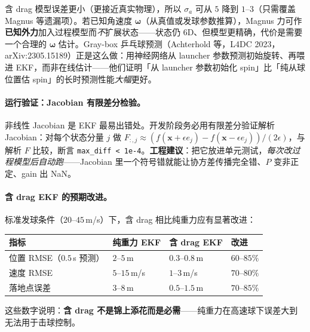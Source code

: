 含 drag 模型误差更小（更接近真实物理），所以 $\sigma_a$ 可从 $5$ 降到 $1$--$3$（只需覆盖 Magnus 等遗漏项）。若已知角速度 $\boldsymbol\omega$（从真值或发球参数推算），Magnus 力可作\textbf{已知外力}加入过程模型而\emph{不}扩展状态——状态仍 6D、但模型更精确，代价是需要一个合理的 $\boldsymbol\omega$ 估计。Gray-box 乒乓球预测（Achterhold 等，L4DC 2023，arXiv:2305.15189）正是这么做：用神经网络从 launcher 参数预测初始旋转、再喂进 EKF，而非在线估计——他们证明「从 launcher 参数初始化 spin」比「纯从球位置估 spin」的长时预测性能\emph{大幅}更好\cite{achterhold2023graybox}。

\paragraph{运行验证：Jacobian 有限差分检验。}非线性 Jacobian 是 EKF 最易出错处。开发阶段务必用有限差分验证解析 Jacobian：对每个状态分量 $j$ 做 $F_{:,j}\approx(f(\mathbf x+\epsilon e_j)-f(\mathbf x-\epsilon e_j))/(2\epsilon)$，与解析 $F$ 比较，断言 \verb|max_diff < 1e-4|。\textbf{工程建议}：把它放进单元测试，\emph{每次改过程模型后自动跑}——Jacobian 里一个符号错就能让协方差传播完全错、$P$ 变非正定、gain 出 NaN。

\paragraph{含 drag EKF 的预期改进。}标准发球条件（$20$--$45$\,m/s）下，含 drag 相比纯重力应有显著改进：

\begin{center}
\small
\begin{tabular}{@{}llll@{}}
\toprule
指标 & 纯重力 EKF & 含 drag EKF & 改进 \\
\midrule
位置 RMSE（$0.5$\,s 预测） & $2$--$5$\,m & $0.3$--$0.8$\,m & $60$--$85\%$ \\
速度 RMSE & $5$--$15$\,m/s & $1$--$3$\,m/s & $70$--$80\%$ \\
落地点误差 & $3$--$8$\,m & $0.5$--$1.5$\,m & $70$--$85\%$ \\
\bottomrule
\end{tabular}
\end{center}

这些数字说明：\textbf{含 drag 不是锦上添花而是必需}——纯重力在高速球下误差大到无法用于击球控制。

